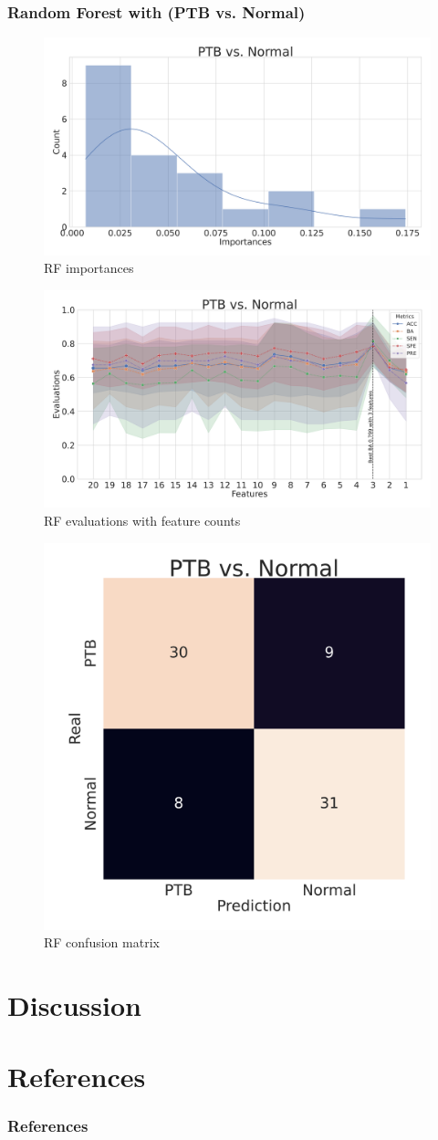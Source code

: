 \documentclass{beamer}
\begin{document}
    \begin{frame}[allowframebreaks]
        \frametitle{Random Forest with (PTB vs. Normal)}

        \begin{figure}
            \includegraphics[width=0.8 \linewidth]{figures/RandomForest_Proportion/RF-PTB.DADA2.homd.Mouth/importances.pdf}
            \caption{RF importances}
        \end{figure}

        \begin{figure}
            \includegraphics[width=0.8 \linewidth]{figures/RandomForest_Proportion/RF-PTB.DADA2.homd.Mouth/metrics.pdf}
            \caption{RF evaluations with feature counts}
        \end{figure}

        \begin{figure}
            \includegraphics[width=0.5 \linewidth]{figures/RandomForest_Proportion/RF-PTB.DADA2.homd.Mouth/heatmap.pdf}
            \caption{RF confusion matrix}
        \end{figure}
    \end{frame}

    \section{Discussion}

    \section{References}
   	\begin{frame}[allowframebreaks]
        \frametitle{References}
        
        
    \end{frame}
\end{document}
